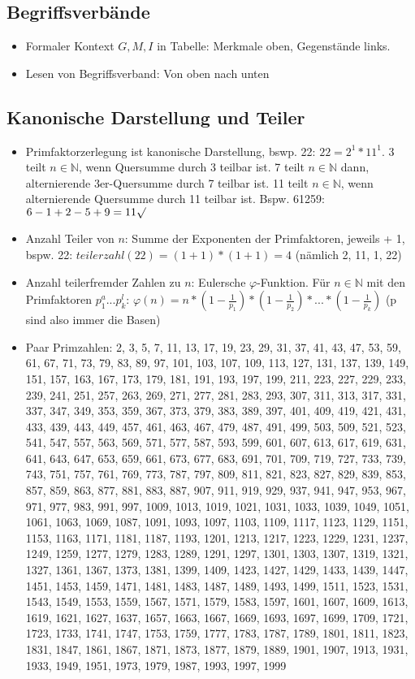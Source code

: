 \documentclass[12pt,landscape]{article}
\begin{document}
\begin{multicols}{3}
\subsection{Begriffsverbände}
\begin{itemize}
\item Formaler Kontext $G, M, I$ in Tabelle: Merkmale oben, Gegenstände links. 
\item Lesen von Begriffsverband: Von oben nach unten
\end{itemize}
\subsection{Kanonische Darstellung und Teiler}
\begin{itemize}
\item Primfaktorzerlegung ist kanonische Darstellung, bswp. 22: $22 = 2^1 * 11^1$. 3 teilt $n \in \mathbb{N}$, wenn Quersumme durch 3 teilbar ist. 7 teilt $n \in \mathbb{N}$ dann, alternierende 3er-Quersumme durch 7 teilbar ist. 11 teilt $n \in \mathbb{N}$, wenn alternierende Quersumme durch 11 teilbar ist. Bspw. 61259: $6 - 1 + 2 - 5 + 9 = 11 \surd$
\item Anzahl Teiler von $n$: Summe der Exponenten der Primfaktoren, jeweils + 1, bspw. 22: $teilerzahl(22) = (1+1)*(1+1) = 4$ (nämlich 2, 11, 1, 22)
\item Anzahl teilerfremder Zahlen zu $n$: Eulersche $\varphi$-Funktion. Für $n \in \mathbb{N}$ mit den Primfaktoren $p_1^a ... p_k^l$: $\varphi(n)=n*(1-\frac{1}{p_1})*(1-\frac{1}{p_2})*...*(1-\frac{1}{p_k})$ (p sind also immer die Basen)
\item Paar Primzahlen: 2, 3, 5, 7, 11, 13, 17, 19, 23, 29, 31, 37, 41, 43, 47, 53, 59, 61, 67, 71, 73, 79, 83, 89, 97, 101, 103, 107, 109, 113, 127, 131, 137, 139, 149, 151, 157, 163, 167, 173, 179, 181, 191, 193, 197, 199, 211, 223, 227, 229, 233, 239, 241, 251, 257, 263, 269, 271, 277, 281, 283, 293, 307, 311, 313, 317, 331, 337, 347, 349, 353, 359, 367, 373, 379, 383, 389, 397, 401, 409, 419, 421, 431, 433, 439, 443, 449, 457, 461, 463, 467, 479, 487, 491, 499, 503, 509, 521, 523, 541, 547, 557, 563, 569, 571, 577, 587, 593, 599, 601, 607, 613, 617, 619, 631, 641, 643, 647, 653, 659, 661, 673, 677, 683, 691, 701, 709, 719, 727, 733, 739, 743, 751, 757, 761, 769, 773, 787, 797, 809, 811, 821, 823, 827, 829, 839, 853, 857, 859, 863, 877, 881, 883, 887, 907, 911, 919, 929, 937, 941, 947, 953, 967, 971, 977, 983, 991, 997, 1009, 1013, 1019, 1021, 1031, 1033, 1039, 1049, 1051, 1061, 1063, 1069, 1087, 1091, 1093, 1097, 1103, 1109, 1117, 1123, 1129, 1151, 1153, 1163, 1171, 1181, 1187, 1193, 1201, 1213, 1217, 1223, 1229, 1231, 1237, 1249, 1259, 1277, 1279, 1283, 1289, 1291, 1297, 1301, 1303, 1307, 1319, 1321, 1327, 1361, 1367, 1373, 1381, 1399, 1409, 1423, 1427, 1429, 1433, 1439, 1447, 1451, 1453, 1459, 1471, 1481, 1483, 1487, 1489, 1493, 1499, 1511, 1523, 1531, 1543, 1549, 1553, 1559, 1567, 1571, 1579, 1583, 1597, 1601, 1607, 1609, 1613, 1619, 1621, 1627, 1637, 1657, 1663, 1667, 1669, 1693, 1697, 1699, 1709, 1721, 1723, 1733, 1741, 1747, 1753, 1759, 1777, 1783, 1787, 1789, 1801, 1811, 1823, 1831, 1847, 1861, 1867, 1871, 1873, 1877, 1879, 1889, 1901, 1907, 1913, 1931, 1933, 1949, 1951, 1973, 1979, 1987, 1993, 1997, 1999

\end{itemize}
\end{multicols}
\end{document}

